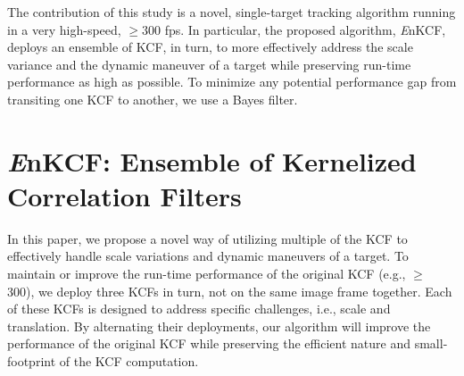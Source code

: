 \documentclass{bmvc2k}
\begin{document}
The contribution of this study is a novel, single-target tracking
algorithm running in a very high-speed, $\geq 300$ fps. In particular,
the proposed algorithm, {\it E}nKCF, deploys an ensemble of KCF, in
turn, to more effectively address the scale variance and the dynamic
maneuver of a target while preserving run-time performance as high as
possible. To minimize any potential performance gap from transiting
one KCF to another, we use a Bayes filter.

\section{{\it E}nKCF: Ensemble of Kernelized Correlation Filters}
In this paper, we propose a novel way of utilizing multiple of the KCF
\cite{henriques2015high} to effectively handle scale variations and
dynamic maneuvers of a target. To maintain or improve the run-time
performance of the original KCF (e.g., $\ge$ 300), we deploy three
KCFs in turn, not on the same image frame together. Each of these KCFs
is designed to address specific challenges, i.e., scale and
translation. By alternating their deployments, our algorithm will
improve the performance of the original KCF while preserving the
efficient nature and small-footprint of the KCF computation. 
\end{document}
